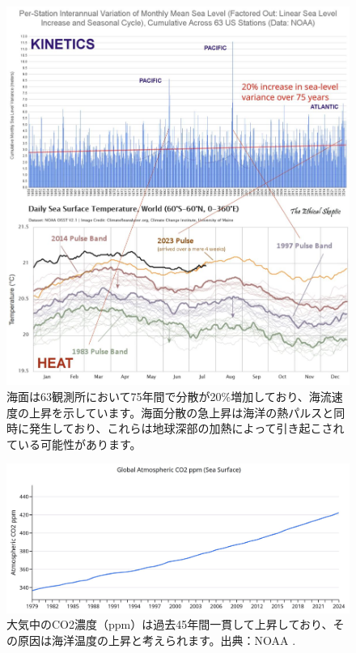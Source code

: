 \documentclass[10pt,twocolumn,letterpaper]{article}
\begin{document}
\begin{figure}[t]
\begin{center}
\includegraphics[width=1\textwidth]{sealevel.jpeg}
\end{center}
   \caption{海面は63観測所において75年間で分散が20\%増加しており、海流速度の上昇を示しています。海面分散の急上昇は海洋の熱パルスと同時に発生しており、これらは地球深部の加熱によって引き起こされている可能性があります\cite{2,129}。}
\label{fig:22}
\end{figure}

\begin{figure}[t]
\begin{center}
\includegraphics[width=1\textwidth]{co2.jpg}
\end{center}
   \caption{大気中のCO2濃度（ppm）は過去45年間一貫して上昇しており、その原因は海洋温度の上昇と考えられます。出典：NOAA \cite{148,129}.}
\label{fig:23}
\end{figure}
\end{document}
